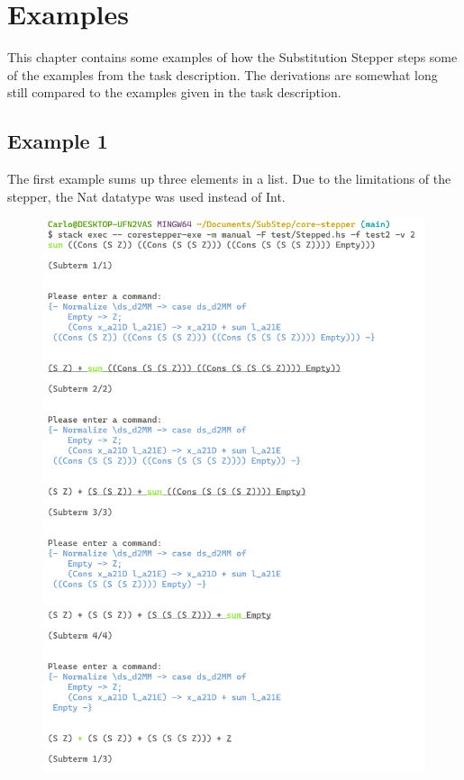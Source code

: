 \chapter{Examples}
\label{chptr:examples}
This chapter contains some examples of how the Substitution Stepper steps some of the examples from the task description.
The derivations are somewhat long still compared to the examples given in the task description.

\section{Example 1}
The first example sums up three elements in a list.
Due to the limitations of the stepper,
the Nat datatype was used instead of Int.

\begin{figure}
    \includegraphics[width=1\textwidth]{resources/sum_part_1.PNG}
\end{figure}
